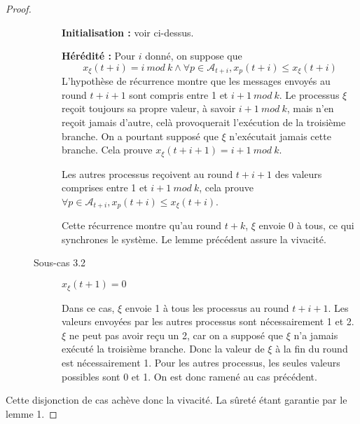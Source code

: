 \documentclass{article}
\begin{document}
\begin{proof}
\begin{description}
\begin{description}
					\textbf{Initialisation : } voir ci-dessus.

					\textbf{Hérédité : } Pour $i$ donné, on suppose que 
					$$x_\xi(t+i) = i~mod~k \wedge \forall p \in \mathcal{A}_{t+i}, x_p(t+i) \leq x_\xi(t+i)$$
					L'hypothèse de récurrence montre que les messages envoyés au round $t+i+1$ sont compris entre 1 et $i+1~mod~k$.
					Le processus $\xi$ reçoit toujours sa propre valeur, à savoir $i+1~mod~k$, mais n'en reçoit jamais d'autre, celà provoquerait l'exécution de la troisième branche.
					On a pourtant supposé que $\xi$ n'exécutait jamais cette branche. Cela prouve $x_\xi(t+i+1) = i+1~mod~k$.

					Les autres processus reçoivent au round $t+i+1$ des valeurs comprises entre 1 et $i+1~mod~k$, cela prouve $\forall p \in \mathcal{A}_{t+i}, x_p(t+i) \leq x_\xi(t+i)$.

					Cette récurrence montre qu'au round $t+k$, $\xi$ envoie 0 à tous, ce qui synchrones le système. Le lemme précédent assure la vivacité.

				\item[Sous-cas 3.2] $x_\xi(t+1) = 0$

					Dans ce cas, $\xi$ envoie 1 à tous les processus au round $t+i+1$. Les valeurs envoyées par les autres processus sont nécessairement 1 et 2.
					$\xi$ ne peut pas avoir reçu un 2, car on a supposé que $\xi$ n'a jamais exécuté la troisième branche. Donc la valeur de $\xi$ à la fin du round est nécessairement 1.
					Pour les autres processus, les seules valeurs possibles sont 0 et 1. On est donc ramené au cas précédent.
			\end{description}
	\end{description}

	Cette disjonction de cas achève donc la vivacité. La sûreté étant garantie par le lemme 1.
\end{proof}
\end{document}
